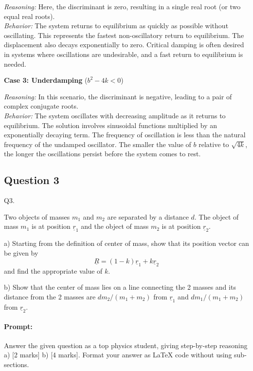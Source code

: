 \documentclass{article}
\begin{document}
\noindent \textit{Reasoning:} Here, the discriminant is zero, resulting in a single real root (or two equal real roots). \\
\textit{Behavior:} The system returns to equilibrium as quickly as possible without oscillating. This represents the fastest non-oscillatory return to equilibrium. The displacement also decays exponentially to zero. Critical damping is often desired in systems where oscillations are undesirable, and a fast return to equilibrium is needed.

\noindent \textbf{Case 3: Underdamping} (\(b^2 - 4k < 0\))

\noindent \textit{Reasoning:} In this scenario, the discriminant is negative, leading to a pair of complex conjugate roots. \\
\textit{Behavior:} The system oscillates with decreasing amplitude as it returns to equilibrium. The solution involves sinusoidal functions multiplied by an exponentially decaying term. The frequency of oscillation is less than the natural frequency of the undamped oscillator. The smaller the value of \(b\) relative to \(\sqrt{4k}\), the longer the oscillations persist before the system comes to rest.

\subsection{Question 3}
Q3.

Two objects of masses $m_1$ and $m_2$ are separated by a distance $d$. The object of mass $m_1$ is at
position $\underline{r}_1$ and the object of mass $m_2$ is at position $\underline{r}_2$.

a) Starting from the definition of center of mass, show that its position vector can be given by
$$\underline{R} = (1-k)\underline{r}_1 + k\underline{r}_2$$
and find the appropriate value of $k$.

b) Show that the center of mass lies on a line connecting the 2 masses and its distance from the 2
masses are $dm_2/(m_1+m_2)$ from $\underline{r}_1$ and $dm_1/(m_1+m_2)$ from $\underline{r}_2$.

\paragraph{Prompt: \\} 
Answer the given question as a top physics student, giving step-by-step reasoning a) [2 marks] b) [4 marks]. Format your answer as LaTeX code without using sub-sections.
\end{document}
